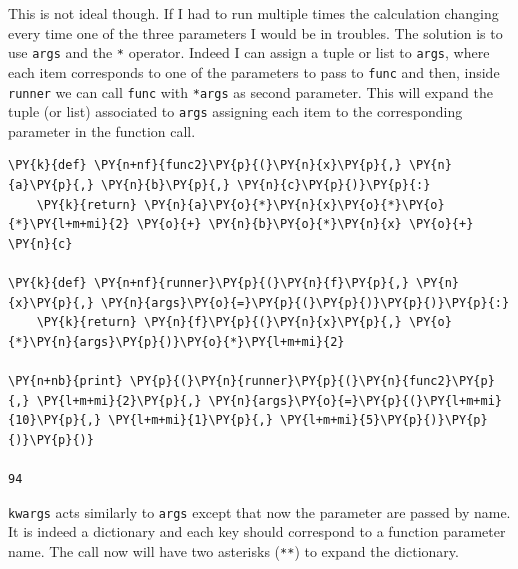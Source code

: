 This is not ideal though. If I had to run multiple times the calculation changing every time one of the three parameters I would be in troubles. 
The solution is to use \texttt{args} and the \texttt{*} operator. Indeed I can assign a tuple or list to \texttt{args}, where each item corresponds to one of the parameters to pass to \texttt{func} and then, inside \texttt{runner} we can call \texttt{func} with \texttt{*args} as second parameter. This will expand the tuple (or list) associated to \texttt{args} assigning each item to the corresponding parameter in the function call.

\begin{tcolorbox}[breakable, size=fbox, boxrule=1pt, pad at break*=1mm,colback=cellbackground, colframe=cellborder]
\begin{Verbatim}[commandchars=\\\{\}]
\PY{k}{def} \PY{n+nf}{func2}\PY{p}{(}\PY{n}{x}\PY{p}{,} \PY{n}{a}\PY{p}{,} \PY{n}{b}\PY{p}{,} \PY{n}{c}\PY{p}{)}\PY{p}{:}
    \PY{k}{return} \PY{n}{a}\PY{o}{*}\PY{n}{x}\PY{o}{*}\PY{o}{*}\PY{l+m+mi}{2} \PY{o}{+} \PY{n}{b}\PY{o}{*}\PY{n}{x} \PY{o}{+} \PY{n}{c}
 		
\PY{k}{def} \PY{n+nf}{runner}\PY{p}{(}\PY{n}{f}\PY{p}{,} \PY{n}{x}\PY{p}{,} \PY{n}{args}\PY{o}{=}\PY{p}{(}\PY{p}{)}\PY{p}{)}\PY{p}{:}
    \PY{k}{return} \PY{n}{f}\PY{p}{(}\PY{n}{x}\PY{p}{,} \PY{o}{*}\PY{n}{args}\PY{p}{)}\PY{o}{*}\PY{l+m+mi}{2}
 		
\PY{n+nb}{print} \PY{p}{(}\PY{n}{runner}\PY{p}{(}\PY{n}{func2}\PY{p}{,} \PY{l+m+mi}{2}\PY{p}{,} \PY{n}{args}\PY{o}{=}\PY{p}{(}\PY{l+m+mi}{10}\PY{p}{,} \PY{l+m+mi}{1}\PY{p}{,} \PY{l+m+mi}{5}\PY{p}{)}\PY{p}{)}\PY{p}{)}
 
94
\end{Verbatim}
\end{tcolorbox}

\texttt{kwargs} acts similarly to \texttt{args} except that now the parameter are passed by name. It is indeed a dictionary and each key should correspond to a function parameter name. The call now will have two asterisks (\texttt{**}) to expand the dictionary.
 
